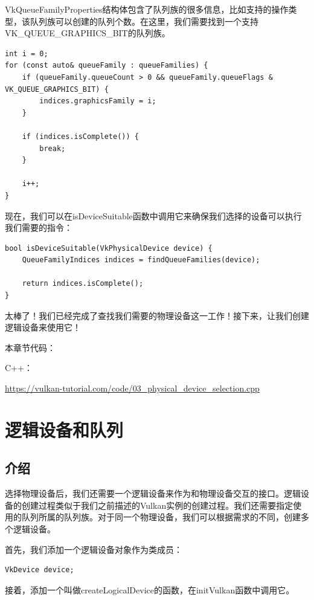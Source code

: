 \documentclass{ctexart}
\begin{document}
VkQueueFamilyProperties结构体包含了队列族的很多信息，比如支持的操作类型，该队列族可以创建的队列个数。在这里，我们需要找到一个支持VK\_QUEUE\_GRAPHICS\_BIT的队列族。

\begin{lstlisting}[language={[ANSI]C}]
int i = 0;
for (const auto& queueFamily : queueFamilies) {
	if (queueFamily.queueCount > 0 && queueFamily.queueFlags & VK_QUEUE_GRAPHICS_BIT) {
		indices.graphicsFamily = i;
	}

	if (indices.isComplete()) {
		break;
	}

	i++;
}
\end{lstlisting}

现在，我们可以在isDeviceSuitable函数中调用它来确保我们选择的设备可以执行我们需要的指令：

\begin{lstlisting}[language={[ANSI]C}]
bool isDeviceSuitable(VkPhysicalDevice device) {
	QueueFamilyIndices indices = findQueueFamilies(device);

	return indices.isComplete();
}
\end{lstlisting}

太棒了！我们已经完成了查找我们需要的物理设备这一工作！接下来，让我们创建逻辑设备来使用它！

本章节代码：

C++：

\url{https://vulkan-tutorial.com/code/03_physical_device_selection.cpp}

\newpage
\section{逻辑设备和队列}

\subsection{介绍}

选择物理设备后，我们还需要一个逻辑设备来作为和物理设备交互的接口。逻辑设备的创建过程类似于我们之前描述的Vulkan实例的创建过程。我们还需要指定使用的队列所属的队列族。对于同一个物理设备，我们可以根据需求的不同，创建多个逻辑设备。

首先，我们添加一个逻辑设备对象作为类成员：

\begin{lstlisting}[language={[ANSI]C}]
VkDevice device;
\end{lstlisting}

接着，添加一个叫做createLogicalDevice的函数，在initVulkan函数中调用它。
\end{document}
